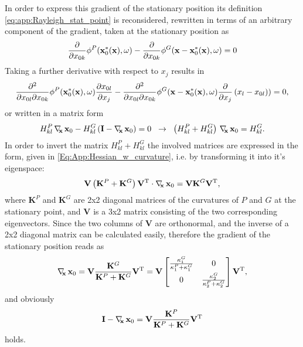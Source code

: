 In order to express this gradient of the stationary position its definition \eqref{eq:app:Rayleigh_stat_point} is reconsidered, rewritten in terms of an arbitrary component of the gradient, taken at the stationary position as
\begin{equation}
\frac{\partial}{\partial x_{0 k}} \phi^P(\mathbf{x}_0^*(\mathbf{x}),\omega) - \frac{\partial}{\partial x_{0 k}}\phi^G(\mathbf{x}-\mathbf{x}_0^*(\mathbf{x}),\omega)  = 0
\end{equation}
Taking a further derivative with respect to $x_j$ results in
\begin{equation}
\frac{\partial^2}{\partial x_{0 l} \partial x_{0 k}} \phi^P(\mathbf{x}_0^*(\mathbf{x}),\omega) \frac{\partial x_{0 l}}{\partial x_j}
- \frac{\partial^2}{\partial x_{0 l} \partial x_{0 k}} \phi^G(\mathbf{x}-\mathbf{x}_0^*(\mathbf{x}),\omega)  \frac{\partial}{\partial x_j} \left( x_l - x_{0 l} ) \right) = 0,
\end{equation}
or written in a matrix form
\begin{equation}
H^P_{kl} \, \nabla_{\!\!\mathbf{x}}\, \mathbf{x}_0 - H^G_{kl} \left( \mathbf{I} - \nabla_{\!\!\mathbf{x}}\, \mathbf{x}_0 \right) = 0 \hspace{2mm} \rightarrow \hspace{2mm} \left( H^P_{kl} +  H^G_{kl} \right) \, \nabla_{\!\!\mathbf{x}}\, \mathbf{x}_0 = H^G_{kl}. 
\end{equation}
In order to invert the matrix $H^P_{kl} +  H^G_{kl}$ the involved matrices are expressed in the form, given in \eqref{Eq:App:Hessian_w_curvature}, i.e. by transforming it into it's eigenspace:
\begin{equation}
 \mathbf{V} \left( \mathbf{K}^P + \mathbf{K}^G \right) \mathbf{V}^{\mathrm{T}} \cdot \nabla_{\!\!\mathbf{x}}\, \mathbf{x}_0 =   \mathbf{V} \mathbf{K}^G \mathbf{V}^{\mathrm{T}},
\end{equation}
where $\mathbf{K}^P$ and $\mathbf{K}^G$ are 2x2 diagonal matrices of the curvatures of $P$ and $G$ at  the stationary point, and $\mathbf{V}$ is a 3x2 matrix consisting of the two corresponding eigenvectors.
Since the two columns of $\mathbf{V}$ are orthonormal, and the inverse of a 2x2 diagonal matrix can be calculated easily, therefore the gradient of the stationary position reads as
\begin{equation}
\nabla_{\!\!\mathbf{x}}\, \mathbf{x}_0 =  \mathbf{V} \frac{\mathbf{K}^G}{\mathbf{K}^P + \mathbf{K}^G} \mathbf{V}^{\mathrm{T}} = 
\mathbf{V} 
\begin{bmatrix}
\frac{\kappa_1^G}{\kappa_1^P + \kappa_1^G} & 0 \\[.5em]
0 & \frac{\kappa_2^G}{\kappa_2^P + \kappa_2^G}
\\[0.3em]    \end{bmatrix}
\mathbf{V}^{\mathrm{T}},
\end{equation}
and obviously
\begin{equation}
\mathbf{I} - \nabla_{\!\!\mathbf{x}}\, \mathbf{x}_0 =  \mathbf{V} \frac{\mathbf{K}^P}{\mathbf{K}^P + \mathbf{K}^G} \mathbf{V}^{\mathrm{T}}
\end{equation}
holds.
	
